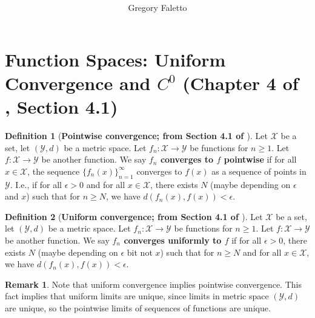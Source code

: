 \documentclass{article}
\title{
    \vspace{2in}
    \textmd{\textbf{ \hmwkTitle}}\\
}
\author{Gregory Faletto}
\date{}
\theoremstyle{definition}
\theoremstyle{definition}
\theoremstyle{definition}
\theoremstyle{definition}
\theoremstyle{definition}
\newtheorem{definition}{Definition}[section]
\newtheorem*{remark}{Remark}
\theoremstyle{definition}
\theoremstyle{definition}
\begin{document}
\maketitle

\pagebreak


%
%



\newpage


\section{Function Spaces: Uniform Convergence and \(C^0\) (Chapter 4 of \citet{pugh2015real}, Section 4.1)}

\begin{definition}[\textbf{Pointwise convergence; from Section 4.1 of \citet{pugh2015real}}]

Let \(\mathcal{X}\) be a set, let \((\mathcal{Y}, d)\) be a metric space. Let \(f_n : \mathcal{X} \to \mathcal{Y}\) be functions for \(n \geq 1\). Let \(f: \mathcal{X} \to \mathcal{Y}\) be another function. We say \textbf{\(f_n\) converges to \(f\) pointwise} if for all \(x \in \mathcal{X}\), the sequence \(\{ f_n(x)\}_{n=1}^\infty\) converges to \(f(x)\) as a sequence of points in \(\mathcal{Y}\). I.e., if for all \(\epsilon > 0\) and for all \(x \in \mathcal{X}\), there exists \(N\) (maybe depending on \(\epsilon\) and \(x\)) such that for \( n \geq N\), we have \(d(f_n(x), f(x)) < \epsilon\). 

\end{definition}

\begin{definition}[\textbf{Uniform convergence; from Section 4.1 of \citet{pugh2015real}}]

Let \(\mathcal{X}\) be a set, let \((\mathcal{Y}, d)\) be a metric space. Let \(f_n : \mathcal{X} \to \mathcal{Y}\) be functions for \(n \geq 1\). Let \(f: \mathcal{X} \to \mathcal{Y}\) be another function. We say \textbf{\(f_n\) converges uniformly to \(f\)} if for all \(\epsilon > 0\), there exists \(N\) (maybe depending on \(\epsilon\) bit not \(x\)) such that for \( n \geq N\) and for all \(x \in \mathcal{X}\), we have \(d(f_n(x), f(x)) < \epsilon\). 

\end{definition}

\begin{remark}

Note that uniform convergence implies pointwise convergence. This fact implies that uniform limits are unique, since limits in metric space \((\mathcal{Y}, d)\) are unique, so the pointwise limits of sequences of functions are unique. 

\end{remark}
\end{document}
